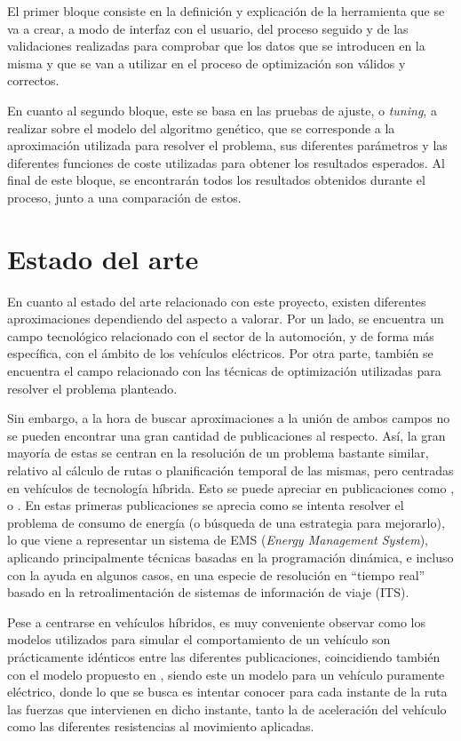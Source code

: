 \documentclass[11pt,spanish,listoffigures,listoftables]{tfgetsinf}
\begin{document}
El primer bloque consiste en la definición y explicación de la herramienta que se va a crear, a modo de interfaz con el usuario, del proceso seguido y de las validaciones realizadas para comprobar que los datos que se introducen en la misma y que se van a utilizar en el proceso de optimización son válidos y correctos.

En cuanto al segundo bloque, este se basa en las pruebas de ajuste, o \textit{tuning}, a realizar sobre el modelo del algoritmo genético, que se corresponde a la aproximación utilizada para resolver el problema, sus diferentes parámetros y las diferentes funciones de coste utilizadas para obtener los resultados esperados. Al final de este bloque, se encontrarán todos los resultados obtenidos durante el proceso, junto a una comparación de estos.

\chapter{Estado del arte}
En cuanto al estado del arte relacionado con este proyecto, existen diferentes aproximaciones dependiendo del aspecto a valorar. Por un lado, se encuentra un campo tecnológico relacionado con el sector de la automoción, y de forma más específica, con el ámbito de los vehículos eléctricos. Por otra parte, también se encuentra el campo relacionado con las técnicas de optimización utilizadas para resolver el problema planteado. %

Sin embargo, a la hora de buscar aproximaciones a la unión de ambos campos no se pueden encontrar una gran cantidad de publicaciones al respecto. Así, la gran mayoría de estas se centran en la resolución de un problema bastante similar, relativo al cálculo de rutas o planificación temporal de las mismas, pero centradas en vehículos de tecnología híbrida. Esto se puede apreciar en publicaciones como \cite{Bader13}, \cite{KJSS10} o \cite{EVS26}. En estas primeras publicaciones se aprecia como se intenta resolver el problema de consumo de energía (o búsqueda de una estrategia para mejorarlo), lo que viene a representar un sistema de EMS (\textit{Energy Management System}), aplicando principalmente técnicas basadas en la programación dinámica, e incluso con la ayuda en algunos casos, en una especie de resolución en ``tiempo real'' basado en la retroalimentación de sistemas de información de viaje (ITS).

Pese a centrarse en vehículos híbridos, es muy conveniente observar como los modelos utilizados para simular el comportamiento de un vehículo son prácticamente idénticos entre las diferentes publicaciones, coincidiendo también con el modelo propuesto en \cite{FIORI2016257}, siendo este un modelo para un vehículo puramente eléctrico, donde lo que se busca es intentar conocer para cada instante de la ruta las fuerzas que intervienen en dicho instante, tanto la de aceleración del vehículo como las diferentes resistencias al movimiento aplicadas.
\end{document}
